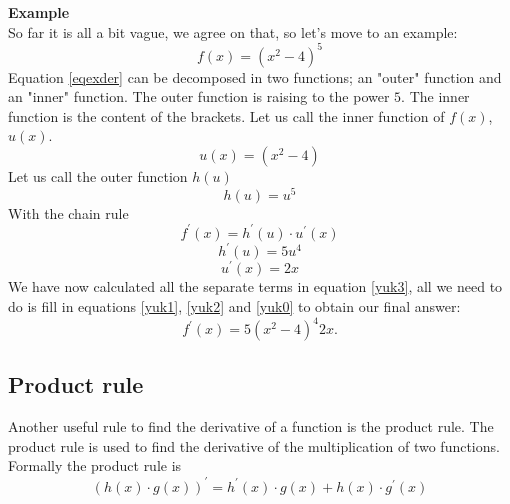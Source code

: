 \documentclass[a4paper]{report}
\begin{document}
\begin{mdframed}[backgroundcolor=exampcol]
\textbf{Example}\\
So far it is all a bit vague, we agree on that, so let's move to an example:
\begin{equation}
f(x)=(x^2-4)^5
\label{eqexder}
\end{equation}
Equation \ref{eqexder} can be decomposed in two functions; an "outer" function and an "inner" function. The outer function is raising to the power $5$. The inner function is the content of the brackets. Let us call the inner function of $f(x)$, $u(x)$. 
\begin{equation}
u(x)=(x^2-4)
\label{yuk0}
\end{equation}
Let us call the outer function $h(u)$
\begin{equation}
h(u)=u^5
\end{equation}
With the chain rule
\begin{equation}
f^\prime(x)=h^\prime(u)\cdot u^\prime(x)
\label{yuk3}
\end{equation}
\begin{equation}
h^\prime(u)=5u^4
\label{yuk1}
\end{equation}
\begin{equation}
u^\prime(x)=2x
\label{yuk2}
\end{equation}
We have now calculated all the separate terms in equation \ref{yuk3}, all we need to do is fill in equations \ref{yuk1}, \ref{yuk2} and \ref{yuk0} to obtain our final answer:
\begin{equation}
f^\prime(x)=5(x^2-4)^4 2x.
\end{equation}
\end{mdframed}

\subsection{Product rule}
Another useful rule to find the derivative of a function is the product rule. The product rule is used to find the derivative of the multiplication of two functions. Formally the product rule is 
\begin{equation}
(h(x)\cdot g(x))^\prime=h^\prime(x)\cdot g(x)+h(x)\cdot g^\prime(x)
\end{equation}
\end{document}
